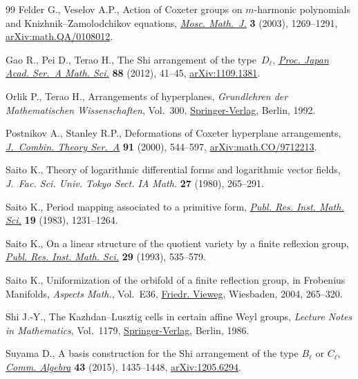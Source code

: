 \documentclass[pdftex]{sigma}
\numberwithin{equation}{section}
\begin{document}
\begin{thebibliography}{99}
Felder G., Veselov A.P., Action of {C}oxeter groups on {$m$}-harmonic
 polynomials and {K}nizhnik--{Z}amolodchikov equations, \href{https://doi.org/10.17323/1609-4514-2003-3-4-1269-1291}{\textit{Mosc.
 Math.~J.}} \textbf{3} (2003), 1269--1291, \href{https://arxiv.org/abs/math.QA/0108012}{arXiv:math.QA/0108012}.

Gao R., Pei D., Terao H., The {S}hi arrangement of the type~{$D_\ell$},
 \href{https://doi.org/10.3792/pjaa.88.41}{\textit{Proc. Japan Acad. Ser.~A Math. Sci.}} \textbf{88} (2012), 41--45,
 \href{https://arxiv.org/abs/1109.1381}{arXiv:1109.1381}.

Orlik P., Terao H., Arrangements of hyperplanes, \textit{Grundlehren der
 Mathematischen Wissenschaften}, Vol.~300, \href{https://doi.org/10.1007/978-3-662-02772-1}{Springer-Verlag}, Berlin, 1992.

Postnikov A., Stanley R.P., Deformations of {C}oxeter hyperplane arrangements,
 \href{https://doi.org/10.1006/jcta.2000.3106}{\textit{J.~Combin. Theory Ser.~A}} \textbf{91} (2000), 544--597,
 \href{https://arxiv.org/abs/math.CO/9712213}{arXiv:math.CO/9712213}.

Saito K., Theory of logarithmic differential forms and logarithmic vector
 fields, \textit{J.~Fac. Sci. Univ. Tokyo Sect. IA Math.} \textbf{27} (1980),
 265--291.

Saito K., Period mapping associated to a primitive form, \href{https://doi.org/10.2977/prims/1195182028}{\textit{Publ. Res.
 Inst. Math. Sci.}} \textbf{19} (1983), 1231--1264.

Saito K., On a linear structure of the quotient variety by a finite reflexion
 group, \href{https://doi.org/10.2977/prims/1195166742}{\textit{Publ. Res. Inst. Math. Sci.}} \textbf{29} (1993), 535--579.

Saito K., Uniformization of the orbifold of a finite reflection group, in
 Frobenius Manifolds, \textit{Aspects Math.}, Vol.~E36, \href{https://doi.org/10.1007/978-3-322-80236-1_11}{Friedr. Vieweg},
 Wiesbaden, 2004, 265--320.

Shi J.-Y., The {K}azhdan--{L}usztig cells in certain affine {W}eyl groups,
 \textit{Lecture Notes in Mathematics}, Vol.~1179, \href{https://doi.org/10.1007/BFb0074968}{Springer-Verlag}, Berlin,
 1986.

Suyama D., A basis construction for the {S}hi arrangement of the type
 {$B_\ell$} or {$C_\ell$}, \href{https://doi.org/10.1080/00927872.2013.865051}{\textit{Comm. Algebra}} \textbf{43} (2015),
 1435--1448, \href{https://arxiv.org/abs/1205.6294}{arXiv:1205.6294}.


\end{thebibliography}
\end{document}
